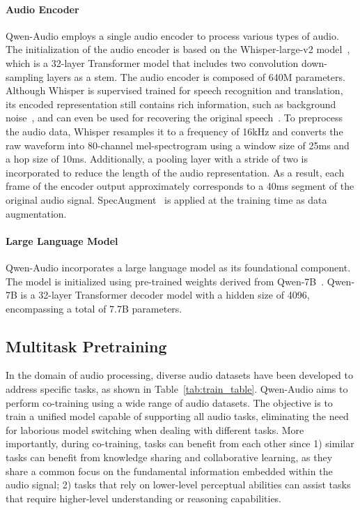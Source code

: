 \documentclass{article}
\begin{document}
\paragraph{Audio Encoder}
Qwen-Audio employs a single audio encoder to process various types of audio. The initialization of the audio encoder is based on the Whisper-large-v2 model~\citep{Whisper}, which is a 32-layer Transformer model that includes two convolution down-sampling layers as a stem. The audio encoder is composed of 640M parameters. Although Whisper is supervised trained for speech recognition and translation, its encoded representation still contains rich information, such as background noise~\citep{whisperAT}, and can even be used for recovering the original speech~\citep{SpeechTokenizer}.
To preprocess the audio data, Whisper resamples it to a frequency of 16kHz and converts the raw waveform into 80-channel mel-spectrogram using a window size of 25ms and a hop size of 10ms. Additionally, a pooling layer with a stride of two is incorporated to reduce the length of the audio representation. As a result, each frame of the encoder output approximately corresponds to a 40ms segment of the original audio signal. SpecAugment~\citep{specaug} is applied at the training time as data augmentation.


\paragraph{Large Language Model}
Qwen-Audio incorporates a large language model as its foundational component. The model is initialized using pre-trained weights derived from Qwen-7B~\citep{bai2023qwen}. Qwen-7B is a 32-layer Transformer decoder model with a hidden size of 4096, encompassing a total of 7.7B parameters.


\subsection{Multitask Pretraining}\label{exp:multitask_train}
In the domain of audio processing, diverse audio datasets have been developed to address specific tasks, as shown in Table~\ref{tab:train_table}. Qwen-Audio aims to perform co-training using a wide range of audio datasets. The objective is to train a unified model capable of supporting all audio tasks, eliminating the need for laborious model switching when dealing with different tasks. More importantly, during co-training, tasks can benefit from each other since 1) similar tasks can benefit from knowledge sharing and collaborative learning, as they share a common focus on the fundamental information embedded within the audio signal; 2) tasks that rely on lower-level perceptual abilities can assist tasks that require higher-level understanding or reasoning capabilities.
\end{document}
